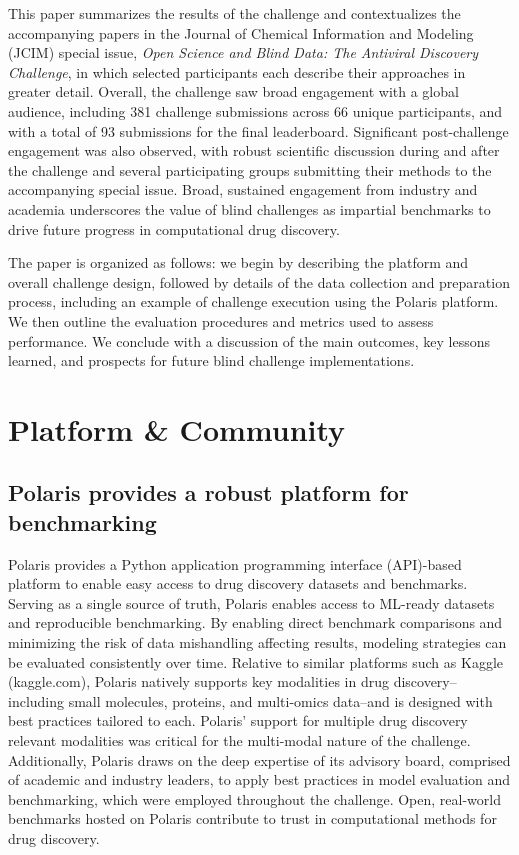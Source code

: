 \documentclass[journal=jcim,manuscript=article]{achemso}
\begin{document}
This paper summarizes the results of the challenge and contextualizes the accompanying papers in the Journal of Chemical Information and Modeling (JCIM) special issue, \textit{Open Science and Blind Data: The Antiviral Discovery Challenge}, in which selected participants each describe their approaches in greater detail. Overall, the challenge saw broad engagement with a global audience, including 381 challenge submissions across 66 unique participants, and with a total of 93 submissions for the final leaderboard. Significant post-challenge engagement was also observed, with robust scientific discussion during and after the challenge and several participating groups submitting their methods to the accompanying special issue. Broad, sustained engagement from industry and academia underscores the value of blind challenges as impartial benchmarks to drive future progress in computational drug discovery. 

The paper is organized as follows: we begin by describing the platform and overall challenge design, followed by details of the data collection and preparation process, including an example of challenge execution using the Polaris platform. We then outline the evaluation procedures and metrics used to assess performance. We conclude with a discussion of the main outcomes, key lessons learned, and prospects for future blind challenge implementations.

\section{Platform \& Community}

\subsection{Polaris provides a robust platform for benchmarking}

 Polaris provides a Python application programming interface (API)-based platform to enable easy access to drug discovery datasets and benchmarks. Serving as a single source of truth, Polaris enables access to ML-ready datasets and reproducible benchmarking\cite{Polaris_website, wognum_call_2024}. By enabling direct benchmark comparisons and minimizing the risk of data mishandling affecting results, modeling strategies can be evaluated consistently over time. Relative to similar platforms such as Kaggle (kaggle.com), Polaris natively supports key modalities in drug discovery--including small molecules, proteins, and multi-omics data--and is designed with best practices tailored to each. Polaris' support for multiple drug discovery relevant modalities was critical for the multi-modal nature of the challenge.  Additionally, Polaris draws on the deep expertise of its advisory board, comprised of academic and industry leaders, to apply best practices in model evaluation and benchmarking\cite{ash_practically_2024}, which were employed throughout the challenge. Open, real-world benchmarks hosted on Polaris contribute to trust in computational methods for drug discovery.
\end{document}
